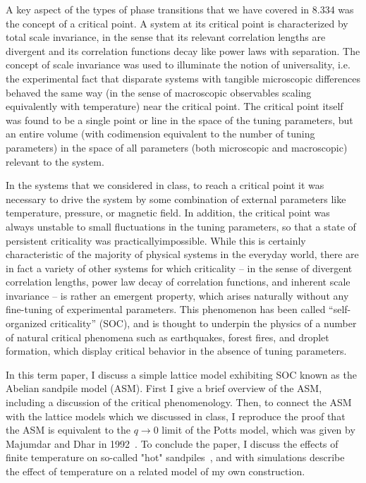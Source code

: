 \documentclass[aps,prb,reprint,superscriptaddress]{revtex4-2}
\begin{document}
A key aspect of the types of phase transitions that we have covered in 8.334 was the concept of a critical point. A system at its critical point is characterized by total scale invariance, in the sense that its relevant correlation lengths are divergent and its correlation functions decay like power laws with separation. The concept of scale invariance was used to illuminate the notion of universality, i.e. the experimental fact that disparate systems with tangible microscopic differences behaved the same way (in the sense of macroscopic observables scaling equivalently with temperature) near the critical point. The critical point itself was found to be a single point or line in the space of the tuning parameters, but an entire volume (with codimension equivalent to the number of tuning parameters) in the space of all parameters (both microscopic and macroscopic) relevant to the system.

In the systems that we considered in class, to reach a critical point it was necessary to drive the system by some combination of external parameters like temperature, pressure, or magnetic field. In addition, the critical point was always unstable to small fluctuations in the tuning parameters, so that a state of persistent criticality was practicallyimpossible. While this is certainly characteristic of the majority of physical systems in the everyday world, there are in fact a variety of other systems for which criticality -- in the sense of divergent correlation lengths, power law decay of correlation functions, and inherent scale invariance -- is rather an emergent property, which arises naturally without any fine-tuning of experimental parameters. This phenomenon has been called ``self-organized criticality'' (SOC), and is thought to underpin the physics of a number of natural critical phenomena such as earthquakes, forest fires, and droplet formation, which display critical behavior in the absence of tuning parameters.

In this term paper, I discuss a simple lattice model exhibiting SOC known as the Abelian sandpile model (ASM). First I give a brief overview of the ASM, including a discussion of the critical phenomenology. Then, to connect the ASM with the lattice models which we discussed in class, I reproduce the proof that the ASM is equivalent to the $q \rightarrow 0$ limit of the Potts model, which was given by Majumdar and Dhar in 1992~\cite{majumdar_equivalence_1992}. To conclude the paper, I discuss the effects of finite temperature on so-called "hot" sandpiles~\cite{caldarelli_hot_1996}, and with simulations describe the effect of temperature on a related model of my own construction.
\end{document}
